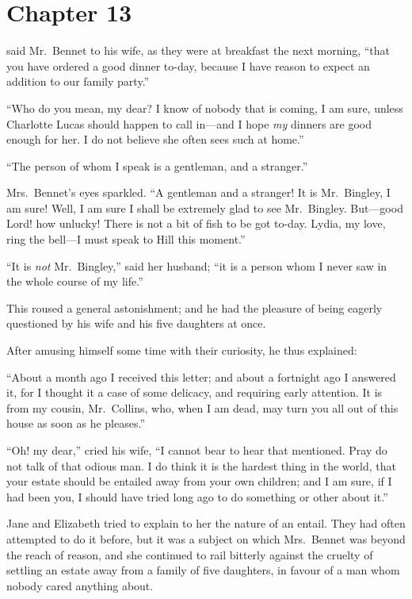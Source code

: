 \chapter{Chapter 13}


 said Mr.\ Bennet to his wife, as they were
at breakfast the next morning, ``that you have ordered a good
dinner to-day, because I have reason to expect an addition to
our family party.''

``Who do you mean, my dear?  I know of nobody that is coming,
I am sure, unless Charlotte Lucas should happen to call in---and
I hope \emph{my} dinners are good enough for her.  I do not believe
she often sees such at home.''

``The person of whom I speak is a gentleman, and a stranger.''

Mrs.\ Bennet's eyes sparkled.  ``A gentleman and a stranger!  It is
Mr.\ Bingley, I am sure!  Well, I am sure I shall be extremely glad
to see Mr.\ Bingley.  But---good Lord! how unlucky!  There is not
a bit of fish to be got to-day.  Lydia, my love, ring the bell---I
must speak to Hill this moment.''

``It is \emph{not} Mr.\ Bingley,'' said her husband; ``it is a person whom
I never saw in the whole course of my life.''

This roused a general astonishment; and he had the pleasure of
being eagerly questioned by his wife and his five daughters at
once.

After amusing himself some time with their curiosity, he thus
explained:

``About a month ago I received this letter; and about a fortnight
ago I answered it, for I thought it a case of some delicacy, and
requiring early attention.  It is from my cousin, Mr.\ Collins, who,
when I am dead, may turn you all out of this house as soon as he
pleases.''

``Oh! my dear,'' cried his wife, ``I cannot bear to hear that
mentioned.  Pray do not talk of that odious man.  I do think it is
the hardest thing in the world, that your estate should be entailed
away from your own children; and I am sure, if I had been you, I
should have tried long ago to do something or other about it.''

Jane and Elizabeth tried to explain to her the nature of an entail.
They had often attempted to do it before, but it was a subject
on which Mrs.\ Bennet was beyond the reach of reason, and she
continued to rail bitterly against the cruelty of settling an
estate away from a family of five daughters, in favour of a man
whom nobody cared anything about.

